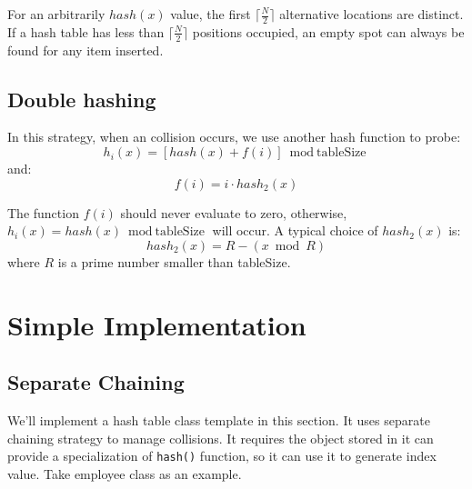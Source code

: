 \documentclass[11pt]{book}
\begin{document}
For an arbitrarily \(hash(x)\) value, the first \(\lceil \frac {N} {2} \rceil\) alternative locations are distinct. If a hash table has less than \(\lceil \frac {N} {2} \rceil\) positions occupied, an empty spot can always be found for any item inserted.

\subsection{Double hashing}
\label{sec:orgfbf23d9}
In this strategy, when an collision occurs, we use another hash function to probe:
\[
h_i(x) = [hash(x) + f(i)] \bmod \text{tableSize}
\]
and:
\[
f(i) = i \cdot hash_2(x)
\]

The function \(f(i)\) should never evaluate to zero, otherwise, \(h_i(x) = hash(x) \bmod \text{tableSize}\) will occur. A typical choice of \(hash_2(x)\) is:
\[
hash_2(x) = R - (x \bmod R)
\]
where \(R\) is a prime number smaller than tableSize.
\section{Simple Implementation}
\label{sec:org161009d}
\subsection{Separate Chaining}
\label{sec:org2eb3503}
We'll implement a hash table class template in this section. It uses separate chaining strategy to manage collisions. It requires the object stored in it can provide a specialization of \texttt{hash()} function, so it can use it to generate index value. Take employee class as an example.
\end{document}
